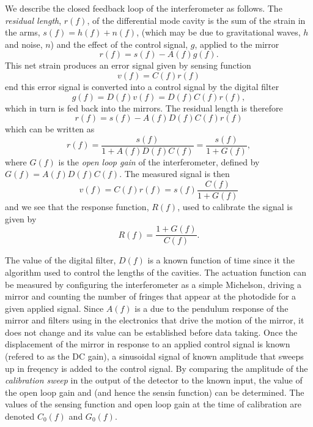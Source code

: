 We describe the closed feedback loop of the interferometer as follows. The
\emph{residual length}, $r(f)$, of the differential mode cavity is the sum of
the strain in the arms, $s(f) = h(f) + n(f)$, (which may be due to
gravitational waves, $h$ and noise, $n$) and the effect of the control signal,
$g$, applied to the mirror
\begin{equation}
r(f) = s(f) - A(f)g(f).
\end{equation}
This net strain produces an error signal given by sensing function
\begin{equation}
v(f) = C(f) r(f)
\end{equation}
end this error signal is converted into a control signal by the digital filter 
\begin{equation}
g(f) = D(f) v(f) = D(f) C(f) r(f),
\end{equation}
which in turn is fed back into the mirrors. The residual length is therefore
\begin{equation}
r(f) = s(f) - A(f)D(f)C(f) r(f)
\end{equation}
which can be written as
\begin{equation}
r(f) = \frac{s(f)}{1 + A(f)D(f)C(f)} = \frac{s(f)}{1 + G(f)},
\end{equation}
where $G(f)$ is the \emph{open loop gain} of the interferometer, defined by
$G(f) = A(f)D(f)C(f)$. The measured signal is then
\begin{equation}
v(f) = C(f) r(f) = s(f) \frac{C(f)}{1 + G(f)}
\end{equation}
and we see that the response function, $R(f)$, used to calibrate the signal is
given by
\begin{equation}
R(f) = \frac{1 + G(f)}{C(f)}.
\end{equation}

The value of the digital filter, $D(f)$ is a known function of time since it
the algorithm used to control the lengths of the cavities.  The actuation
function can be measured by configuring the interferometer as a simple
Michelson, driving a mirror and counting the number of fringes that appear at
the photodide for a given applied signal. Since $A(f)$ is a due to the
pendulum response of the mirror and filters using in the electronics that
drive the motion of the mirror, it does not change and its value can be
established before data taking. Once the displacement of the mirror in
response to an applied control signal is known (refered to as the DC gain), a
sinusoidal signal of known amplitude that sweeps up in freqency is added to
the control signal. By comparing the amplitude of the \emph{calibration sweep}
in the output of the detector to the known input, the value of the open loop
gain and (and hence the sensin function) can be determined. The values of the
sensing function and open loop gain at the time of calibration are denoted
$C_0(f)$ and $G_0(f)$.


